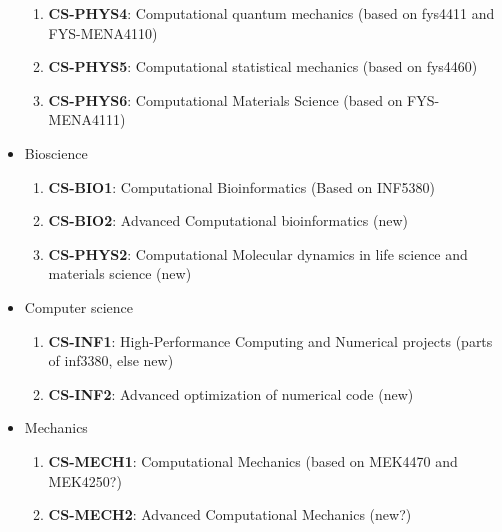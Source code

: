 \documentclass[%
oneside,                 %
final,                   %
10pt]{article}
\begin{document}
\begin{itemize}
\begin{enumerate}
\item \textbf{CS-PHYS4}: Computational quantum mechanics (based on fys4411 and FYS-MENA4110)

\item \textbf{CS-PHYS5}: Computational statistical mechanics (based on fys4460)

\item \textbf{CS-PHYS6}: Computational Materials Science (based on FYS-MENA4111)

\end{enumerate}

\noindent
\item Bioscience
\begin{enumerate}

\item \textbf{CS-BIO1}: Computational Bioinformatics (Based on INF5380)

\item \textbf{CS-BIO2}: Advanced Computational bioinformatics (new)

\item \textbf{CS-PHYS2}: Computational Molecular dynamics in life science and materials science (new)

\end{enumerate}

\noindent
\item Computer science
\begin{enumerate}

\item \textbf{CS-INF1}: High-Performance Computing and Numerical projects (parts of inf3380, else new)

\item \textbf{CS-INF2}: Advanced optimization of numerical code (new)

\end{enumerate}

\noindent
\item Mechanics
\begin{enumerate}

\item \textbf{CS-MECH1}: Computational Mechanics (based on MEK4470 and MEK4250?)

\item \textbf{CS-MECH2}: Advanced Computational Mechanics (new?)
\end{enumerate}

\noindent
\end{itemize}

\noindent
\end{document}
